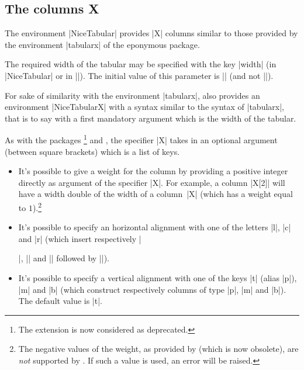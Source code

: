 \documentclass[dvipsnames]{article}%
\begin{document}
\subsection{The columns X}

\label{X-columns}

The environment |{NiceTabular}| provides |X| columns similar to those provided
by the environment |{tabularx}| of the eponymous package.

The required width of the tabular may be specified with the key |width| (in
|{NiceTabular}| or in |\NiceMatrixOptions|). The initial value of this
parameter is |\linewidth| (and not |\textwidth|).

For sake of similarity with the environment |{tabularx}|, 
also provides an environment |{NiceTabularX}| with a syntax similar to the
syntax of |{tabularx}|, that is to say with a first mandatory argument
which is the width of the tabular.

As with the packages \footnote{The extension  is now
considered as deprecated.} and , the specifier |X| takes
in an optional argument (between square brackets) which is a list of keys.
\begin{itemize}
\item It's possible to give a weight for the column by providing a positive
integer directly as argument of the specifier |X|. For example, a column
|X[2]| will have a width double of the width of a column~|X| (which has a
weight equal to $1$).\footnote{The negative values of the weight, as provided
by  (which is now obsolete), are \emph{not} supported by .
If such a value is used, an error will be raised.}
\item It's possible to specify an horizontal alignment with one of the
letters |l|, |c| and |r| (which insert respectively |\raggedright|,
|\centering| and |\raggedleft| followed by |\arraybackslash|).
\item It's possible to specify a vertical alignment with one of the keys
|t| (alias |p|), |m| and |b| (which construct respectively columns of type
|p|, |m| and |b|). The default value is |t|.
\end{itemize}

\end{document}
